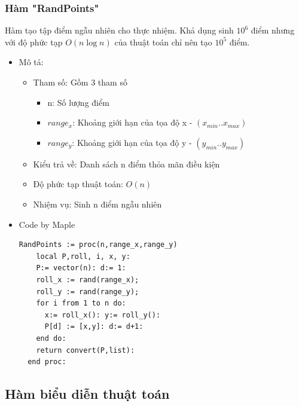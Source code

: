 \documentclass[12pt]{article}
\begin{document}
      \subsubsection*{Hàm "RandPoints"}
        Hàm tạo tập điểm ngẫu nhiên cho thực nhiệm. Khả dụng sinh $10^6$ điểm nhưng với độ phức tạp $O(n \log n)$ của thuật toán chỉ nên tạo $10^5$ điểm.
        \begin{itemize}
          \item Mô tả: 
          \begin{itemize}
            \item Tham số: Gồm 3 tham số
              \begin{itemize}
                \item n: Số lượng điểm
                \item $range_x$: Khoảng giới hạn của tọa độ x - $(x_{min}..x_{max})$ 
                \item $range_y$: Khoảng giới hạn của tọa độ y - $(y_{min}..y_{max})$ 
              \end{itemize}
            \item Kiểu trả về: Danh sách n điểm thỏa mãn điều kiện 
            \item Độ phức tạp thuật toán: $O(n)$
            \item Nhiệm vụ: Sinh n điểm ngẫu nhiên
          \end{itemize}
        \item Code by Maple
          \begin{Verbatim}[frame=single]
  RandPoints := proc(n,range_x,range_y)
    local P,roll, i, x, y:
    P:= vector(n): d:= 1:
    roll_x := rand(range_x);
    roll_y := rand(range_y);
    for i from 1 to n do:
      x:= roll_x(): y:= roll_y():
      P[d] := [x,y]: d:= d+1:
    end do:
    return convert(P,list):
  end proc:
          \end{Verbatim}
        \end{itemize}
        \newpage
    \subsection{Hàm biểu diễn thuật toán}
\end{document}
